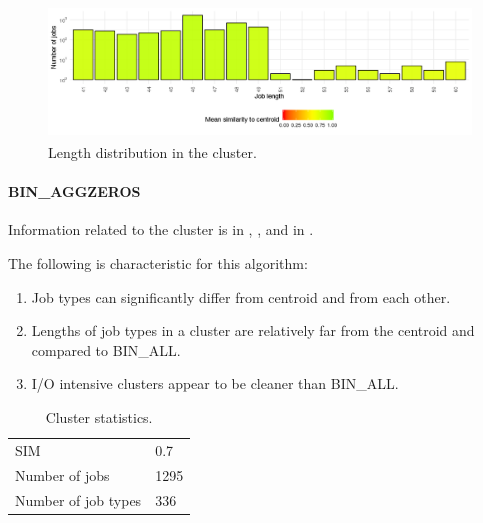 \documentclass[]{llncs}
\begin{document}
\begin{figure}
  \centering
  \includegraphics[width=4.61in,height=1.39in]{./media/image20.png}
  \caption{Length distribution in the cluster.}
  \label{fig:bin_all:length}
\end{figure}


\paragraph{BIN\_AGGZEROS}
Information related to the cluster is in , , and in .

The following is characteristic for this algorithm:

\begin{enumerate}
 \item Job types can significantly differ from centroid and from each other.
 \item Lengths of job types in a cluster are relatively far from the centroid and compared to BIN\_ALL.
 \item I/O intensive clusters appear to be cleaner than BIN\_ALL.
\end{enumerate}

\begin{table}
  \begin{tabular}{ll}
    \centering
    SIM &  0.7 \\
    Number of jobs & 1295 \\
    Number of job types & 336 \\
  \end{tabular}
  \caption{Cluster statistics.}
  \label{tab:bin_aggzeros:stats}
\end{table}
\end{document}

